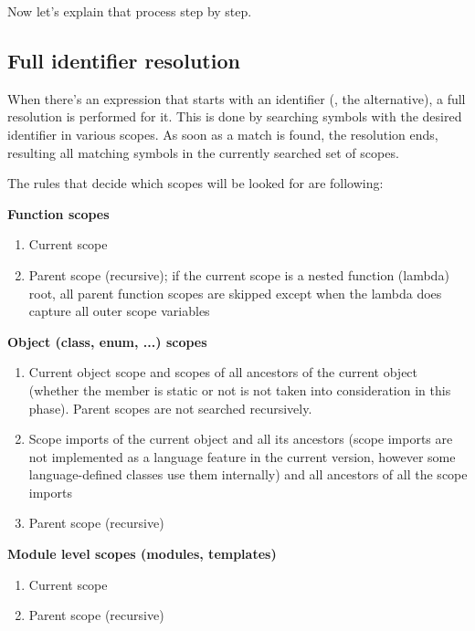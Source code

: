Now let's explain that process step by step.

\subsection{Full identifier resolution} \label{fullIdentifierResolution}
When there's an expression that starts with an identifier (, the  alternative), a full resolution is performed for it. This is done by searching symbols with the desired identifier in various scopes. As soon as a match is found, the resolution ends, resulting all matching symbols in the currently searched set of scopes.

The rules that decide which scopes will be looked for are following:

\textbf{Function scopes}
\begin{enumerate}
	\item Current scope
	\item Parent scope (recursive); if the current scope is a nested function (lambda) root, all parent function scopes are skipped except when the lambda does capture all outer scope variables
\end{enumerate}

\textbf{Object (class, enum, ...) scopes}
\begin{enumerate}
	\item Current object scope and scopes of all ancestors of the current object (whether the member is static or not is not taken into consideration in this phase). Parent scopes are not searched recursively.
	\item Scope imports of the current object and all its ancestors (scope imports are not implemented as a language feature in the current version, however some language-defined classes use them internally) and all ancestors of all the scope imports
	\item Parent scope (recursive)
\end{enumerate}

\textbf{Module level scopes (modules, templates)}
\begin{enumerate}
	\item Current scope
	\item Parent scope (recursive)
\end{enumerate}

\begin{comment}
\textbf{Namespace scopes}
\begin{enumerate}
	\item Current scope and scopes of all namespaces with the same (full) identifier in any of the modules that have been imported in the identifier resolution scope (that means also all imports derived from parent scopes).
	\item Parent scope (recursive)
\end{enumerate}
\end{comment}

